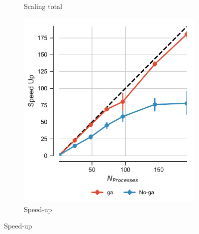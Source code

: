 \begin{figure}[ht!]
\begin{subfigure}{.3\textwidth}
  \caption{Scaling total}
  \label{fig:MPIscaling-split}
\end{subfigure}
\hfill
\begin{subfigure}{.3\textwidth}
  \includegraphics[width=\linewidth]{figures/Comparison_Speed_UP_traj_splitting.pdf}
  \caption{Speed-up}
  \label{fig:MPIspeedup-split}
\end{subfigure}
\bigskip


\end{figure}
